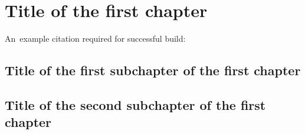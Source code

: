 \chapter{Title of the first chapter}

An~example citation required for successful build: \cite{Example}

\section{Title of the first subchapter of the first chapter}

\section{Title of the second subchapter of the first chapter}
